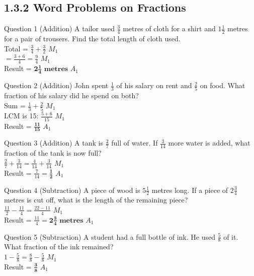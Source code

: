 \documentclass[12pt, a4paper, oneside]{article}
\begin{document}
\newpage

\subsection*{1.3.2 Word Problems on Fractions}

\begin{solvingbox}{Question 1 (Addition)}
A tailor used $\frac{3}{4}$ metres of cloth for a shirt and $1\frac{1}{2}$ metres for a pair of trousers. Find the total length of cloth used. \\
Total = $\frac{3}{4} + \frac{3}{2}$ \hfill $M_1$ \\
$= \frac{3 + 6}{4} = \frac{9}{4}$ \hfill $M_1$ \\
Result = $\mathbf{2\frac{1}{4}\text{ metres}}$ \hfill $A_1$
\end{solvingbox}

\begin{solvingbox}{Question 2 (Addition)}
John spent $\frac{1}{3}$ of his salary on rent and $\frac{2}{5}$ on food. What fraction of his salary did he spend on both? \\
Sum = $\frac{1}{3} + \frac{2}{5}$ \hfill $M_1$ \\
LCM is 15: $\frac{5 + 6}{15}$ \hfill $M_1$ \\
Result = $\mathbf{\frac{11}{15}}$ \hfill $A_1$
\end{solvingbox}

\begin{solvingbox}{Question 3 (Addition)}
A tank is $\frac{2}{7}$ full of water. If $\frac{3}{14}$ more water is added, what fraction of the tank is now full? \\
$\frac{2}{7} + \frac{3}{14} = \frac{4}{14} + \frac{3}{14}$ \hfill $M_1$ \\
Result = $\frac{7}{14} = \mathbf{\frac{1}{2}}$ \hfill $A_1$
\end{solvingbox}

\begin{solvingbox}{Question 4 (Subtraction)}
A piece of wood is $5\frac{1}{2}$ metres long. If a piece of $2\frac{3}{4}$ metres is cut off, what is the length of the remaining piece? \\
$\frac{11}{2} - \frac{11}{4} = \frac{22 - 11}{4}$ \hfill $M_1$ \\
Result = $\frac{11}{4} = \mathbf{2\frac{3}{4}\text{ metres}}$ \hfill $A_1$
\end{solvingbox}

\begin{solvingbox}{Question 5 (Subtraction)}
A student had a full bottle of ink. He used $\frac{5}{8}$ of it. What fraction of the ink remained? \\
$1 - \frac{5}{8} = \frac{8}{8} - \frac{5}{8}$ \hfill $M_1$ \\
Result = $\mathbf{\frac{3}{8}}$ \hfill $A_1$
\end{solvingbox}
\end{document}
